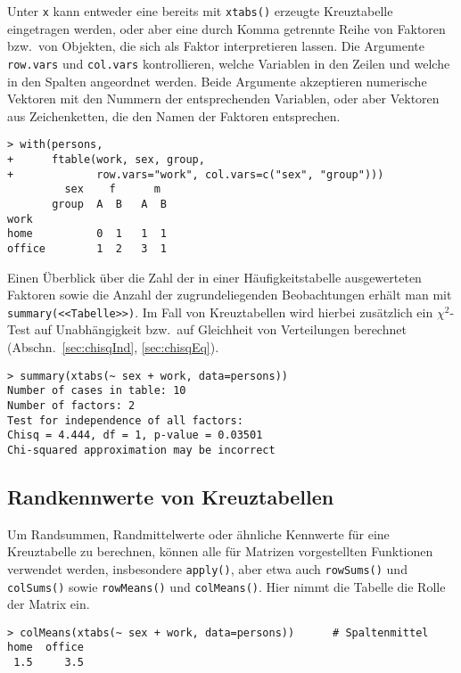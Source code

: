 Unter \lstinline!x! kann entweder eine bereits mit \lstinline!xtabs()! erzeugte Kreuztabelle eingetragen werden, oder aber eine durch Komma getrennte Reihe von Faktoren bzw.\ von Objekten, die sich als Faktor interpretieren lassen. Die Argumente \lstinline!row.vars! und \lstinline!col.vars! kontrollieren, welche Variablen in den Zeilen und welche in den Spalten angeordnet werden. Beide Argumente akzeptieren numerische Vektoren mit den Nummern der entsprechenden Variablen, oder aber Vektoren aus Zeichenketten, die den Namen der Faktoren entsprechen.
\begin{lstlisting}
> with(persons,
+      ftable(work, sex, group,
+             row.vars="work", col.vars=c("sex", "group")))
         sex    f      m
       group  A  B   A  B
work
home          0  1   1  1
office        1  2   3  1
\end{lstlisting}

Einen Überblick über die Zahl der in einer Häufigkeitstabelle ausgewerteten Faktoren sowie die Anzahl der zugrundeliegenden Beobachtungen erhält man mit \lstinline!summary(<<Tabelle>>)!. Im Fall von Kreuztabellen wird hierbei zusätzlich ein $\chi^{2}$-Test auf Unabhängigkeit bzw.\ auf Gleichheit von Verteilungen berechnet (Abschn.\ \ref{sec:chisqInd}, \ref{sec:chisqEq}).
\begin{lstlisting}
> summary(xtabs(~ sex + work, data=persons))
Number of cases in table: 10
Number of factors: 2
Test for independence of all factors:
Chisq = 4.444, df = 1, p-value = 0.03501
Chi-squared approximation may be incorrect
\end{lstlisting}

\subsection{Randkennwerte von Kreuztabellen}

Um Randsummen, Randmittelwerte oder ähnliche Kennwerte für eine Kreuztabelle zu berechnen, können alle für Matrizen vorgestellten Funktionen verwendet werden, insbesondere \lstinline!apply()!, aber etwa auch \lstinline!rowSums()! und \lstinline!colSums()! sowie \lstinline!rowMeans()! und \lstinline!colMeans()!. Hier nimmt die Tabelle die Rolle der Matrix ein.
\begin{lstlisting}
> colMeans(xtabs(~ sex + work, data=persons))      # Spaltenmittel
home  office
 1.5     3.5
\end{lstlisting}

